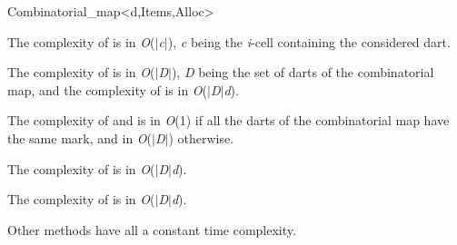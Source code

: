 \begin{ccRefClass}{Combinatorial_map<d,Items,Alloc>}

The complexity of  is in \emph{O}($|$\emph{c}$|$), \emph{c} being the
\emph{i}-cell containing the considered dart.

The complexity of  is in \emph{O}($|$\emph{D}$|$), 
\emph{D} being the set of darts of the combinatorial map, and the complexity of 
 is in \emph{O}($|$\emph{D}$|$\mytimes{}\emph{d}).

The complexity of  and  is in \emph{O}(1) if
all the darts of the combinatorial map have the same mark, and in
\emph{O}($|$\emph{D}$|$) otherwise.

The complexity of  is in
\emph{O}($|$\emph{D}$|$\mytimes{}\emph{d}).

The complexity of  is in \emph{O}($|$\emph{D}$|$\mytimes{}\emph{d}).

Other methods have all a constant time complexity.

\ccSeeAlso
{}\\
\\

\end{ccRefClass}
\ccRefPageEnd
